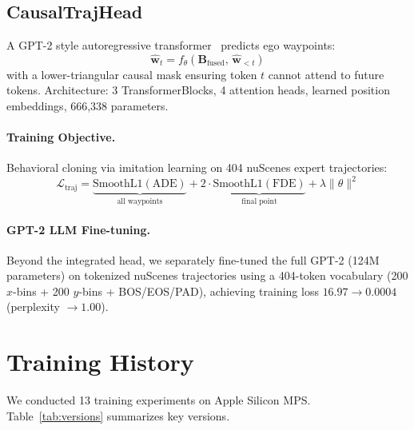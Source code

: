 \documentclass[10pt,twocolumn]{article}
\begin{document}
\subsection{CausalTrajHead}

A GPT-2 style autoregressive transformer~\cite{radford2019gpt2} predicts
ego waypoints:
\begin{equation}
  \hat{\mathbf{w}}_t = f_\theta(\mathbf{B}_{\text{fused}},\, \hat{\mathbf{w}}_{<t})
\end{equation}
with a lower-triangular causal mask ensuring token $t$ cannot attend to
future tokens. Architecture: 3 TransformerBlocks, 4 attention heads,
learned position embeddings, 666,338 parameters.

\paragraph{Training Objective.}
Behavioral cloning via imitation learning on 404 nuScenes expert
trajectories:
\begin{equation}
  \mathcal{L}_{\text{traj}} = \underbrace{\text{SmoothL1}(\text{ADE})}_{\text{all waypoints}}
    + 2\cdot\underbrace{\text{SmoothL1}(\text{FDE})}_{\text{final point}}
    + \lambda \|\theta\|^2
\end{equation}

\paragraph{GPT-2 LLM Fine-tuning.}
Beyond the integrated head, we separately fine-tuned the full GPT-2
(124M parameters) on tokenized nuScenes trajectories using a 404-token
vocabulary (200 $x$-bins + 200 $y$-bins + BOS/EOS/PAD), achieving
training loss $16.97 \to 0.0004$ (perplexity $\to 1.00$).

\section{Training History}
\label{sec:training}

We conducted 13 training experiments on Apple Silicon MPS.
Table~\ref{tab:versions} summarizes key versions.
\end{document}
